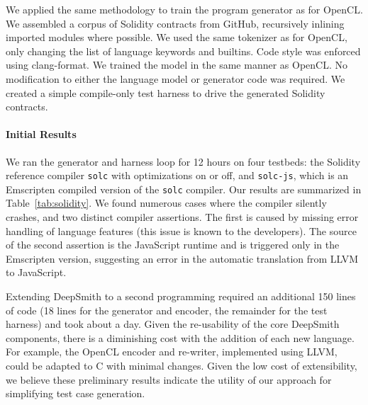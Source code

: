 We applied the same methodology to train the program generator as for OpenCL. We
assembled a corpus of Solidity contracts from GitHub, recursively inlining
imported modules where possible. We used the same tokenizer as for OpenCL, only
changing the list of language keywords and builtins. Code style was enforced
using clang-format. We trained the model in the same manner as OpenCL. No
modification to either the language model or generator code was required. We
created a simple compile-only test harness to drive the generated Solidity
contracts.

\paragraph{Initial Results}

We ran the generator and harness loop for 12 hours on four testbeds: the
Solidity reference compiler \texttt{solc} with optimizations on or off, and
\texttt{solc-js}, which is an Emscripten compiled version of the \texttt{solc}
compiler. Our results are summarized in Table~\ref{tab:solidity}. We found
numerous cases where the compiler silently crashes, and two distinct compiler
assertions. The first is caused by missing error handling of language features
(this issue is known to the developers). The source of the second assertion is
the JavaScript runtime and is triggered only in the Emscripten version,
suggesting an error in the automatic translation from LLVM to JavaScript.

Extending DeepSmith to a second programming required an additional 150 lines of
code (18 lines for the generator and encoder, the remainder for the test
harness) and took about a day. Given the re-usability of the core DeepSmith
components, there is a diminishing cost with the addition of each new language.
For example, the OpenCL encoder and re-writer, implemented using LLVM, could be
adapted to C with minimal changes. Given the low cost of extensibility, we
believe these preliminary results indicate the utility of our approach for
simplifying test case generation.
